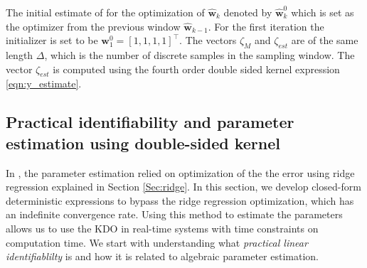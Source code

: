 \documentclass[letterpaper%
, twoside%
, 12pt%
,memoire%
, english%
,creativecommons,hyperref%
]{thETS}
\begin{document}
The initial estimate of for the optimization of $\mathbf{\hat{w}}_{k}$ denoted by $\mathbf{\hat{w}}_{k}^0$ which is set as the optimizer from the previous window $\mathbf{\hat{w}}_{k-1}$. For the first iteration the initializer is set to be $\mathbf{w}_{1}^{0}= [1, 1, 1, 1]^\intercal$. The vectors $\zeta_M$ and $\zeta_{est}$ are of the same length $\Delta$, which is the number of discrete samples in the sampling window. The vector $\zeta_{est}$ is computed using the fourth order double sided kernel expression \eqref{eqn:y_estimate}.

\subsection{Practical identifiability and parameter estimation using double-sided kernel} \label{Sec:pseudo}
In \citep{RN120}, the parameter estimation relied on optimization of the the error using ridge regression explained in Section \ref{Sec:ridge}. In this section, we develop closed-form deterministic expressions to bypass the ridge regression optimization, which has an indefinite convergence rate. Using this method to estimate the parameters allows us to use the KDO in real-time systems with time constraints on computation time. We start with understanding what \textit{practical linear identifiablilty} is and how it is related to algebraic parameter estimation.  
\end{document}
